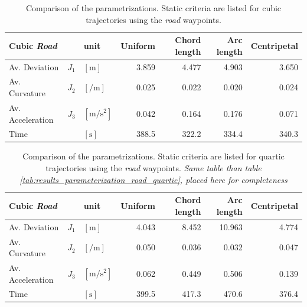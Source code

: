 \begin{table}[h]
\begin{center}
 \begin{tabular}{lll|rrrr}
 \hline
 Cubic \textit{Road} & & unit & Uniform & Chord length & Arc length & Centripetal \\ \hline \hline
 Av. Deviation  & $J_1$ & $[\si{\meter}]$    & 3.859 & 4.477 & 4.903 & 3.650 \\
 Av. Curvature & $J_2$ & $[\si{\per\meter}]$ & 0.025 & 0.022 & 0.020 & 0.024 \\
 Av. Acceleration  & $J_3$ & $[\si{\meter\per\square\second}]$ &  0.042 & 0.164 & 0.176 & 0.071 \\
 Time      &   & $[\si{\second}]$ &  388.5 & 322.2 & 334.4 & 340.3 \\
 \hline
 \end{tabular}
 \caption{Comparison of the parametrizations. Static criteria are listed for cubic trajectories using the \textit{road} waypoints.}\vspace{1ex}
 \label{tab:app_results_parameterization_road_cubic}
\end{center}
\end{table}

\begin{table}[H]
\begin{center}
 \begin{tabular}{lll|rrrr}
 \hline
 Cubic \textit{Road} & & unit & Uniform & Chord length & Arc length & Centripetal \\ \hline \hline
 Av. Deviation  & $J_1$ & $[\si{\meter}]$    & 4.043 & 8.452 & 10.963 & 4.774 \\
 Av. Curvature & $J_2$ & $[\si{\per\meter}]$ & 0.050 & 0.036 & 0.032 & 0.047 \\
 Av. Acceleration  & $J_3$ & $[\si{\meter\per\square\second}]$ &  0.062 & 0.449 & 0.506 & 0.139 \\
 Time      &   & $[\si{\second}]$ &  399.5 & 417.3 & 470.6 & 376.4 \\
 \hline
 \end{tabular}
 \caption{Comparison of the parametrizations. Static criteria are listed for quartic trajectories using the \textit{road} waypoints. \textit{Same table than table \ref{tab:results_parameterization_road_quartic}, placed here for completeness}}\vspace{1ex}
 \label{tab:app_results_parameterization_road_quartic}
\end{center}
\end{table}

